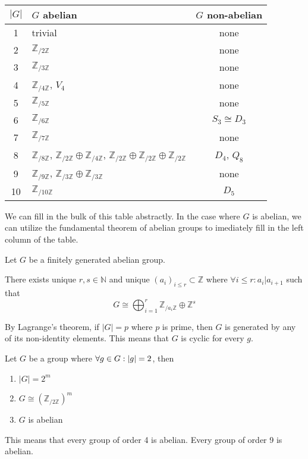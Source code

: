 \begin{center}
   \begin{tabular}{|c|l|c|}
      \(|G|\) & \(G\) abelian & \(G\) non-abelian \\
      \hline
      1 & trivial                                & none\\
      2 & \(\mathbb{Z}_{/2\mathbb{Z}}\)          & none \\
      3 & \(\mathbb{Z}_{/3\mathbb{Z}}\)          & none \\
      4 & \(\mathbb{Z}_{/4\mathbb{Z}}\), \(V_4\) & none \\
      5 & \(\mathbb{Z}_{/5\mathbb{Z}}\)          & none \\
      \hline
      6  & \(\mathbb{Z}_{/6\mathbb{Z}}\)         & \(S_3 \cong D_3\) \\
      7  & \(\mathbb{Z}_{/7\mathbb{Z}}\)         & none \\
      8  & \(\mathbb{Z}_{/8\mathbb{Z}}\), \(\mathbb{Z}_{/2\mathbb{Z}} \oplus \mathbb{Z}_{/4\mathbb{Z}}\), \(\mathbb{Z}_{/2\mathbb{Z}} \oplus \mathbb{Z}_{/2\mathbb{Z}} \oplus \mathbb{Z}_{/2\mathbb{Z}}\)           & \(D_4\), \(Q_8\) \\
      9  & \(\mathbb{Z}_{/9\mathbb{Z}}\), \(\mathbb{Z}_{/3\mathbb{Z}} \oplus \mathbb{Z}_{/3\mathbb{Z}}\) & none \\
      10 & \(\mathbb{Z}_{/10\mathbb{Z}}\)        & \(D_5\) \\
   \end{tabular}
\end{center}

We can fill in the bulk of this table abstractly.
In the case where \(G\) is abelian, we can utilize the fundamental theorem of abelian groups to imediately fill in the left column of the table.

\begin{theorem}
   Let \(G\) be a finitely generated abelian group.

   There exists unique \(r, s \in \mathbb{N}\) and unique \((a_i)_{i \leq r} \subset \mathbb{Z}\) where \(\forall i \leq r: a_i | a_{i+1}\) such that
   \[G \cong \bigoplus_{i = 1}^r \mathbb{Z}_{/a_i\mathbb{Z}} \oplus \mathbb{Z}^s\]
\end{theorem}

By Lagrange's theorem, if \(|G| = p\) where \(p\) is prime, then \(G\) is generated by any of its non-identity elements.
This means that \(G\) is cyclic for every \(g\).

\begin{proposition}
   Let \(G\) be a group where \(\forall g \in G: \left\lvert g\right\rvert = 2\), then
   \begin{enumerate}[label=\roman*, align=Center]
      \item \(|G| = 2^m\)
      \item \(G \cong (\mathbb{Z}_{/2\mathbb{Z}})^m\)
      \item \(G\) is abelian
   \end{enumerate}
\end{proposition}
\begin{remark}
   This means that every group of order 4 is abelian.
   Every group of order 9 is abelian.
\end{remark}

